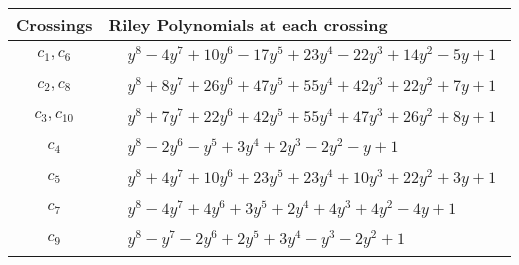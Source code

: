 \documentclass[1p]{elsarticle_modified}
\theoremstyle{definition}
\begin{document}
\begin{tabular}{m{50pt}|m{274pt}}
Crossings & \hspace{64pt}Riley Polynomials at each crossing \\
\hline $$\begin{aligned}c_{1},c_{6}\end{aligned}$$&$\begin{aligned}
&y^8-4 y^7+10 y^6-17 y^5+23 y^4-22 y^3+14 y^2-5 y+1
\end{aligned}$\\
\hline $$\begin{aligned}c_{2},c_{8}\end{aligned}$$&$\begin{aligned}
&y^8+8 y^7+26 y^6+47 y^5+55 y^4+42 y^3+22 y^2+7 y+1
\end{aligned}$\\
\hline $$\begin{aligned}c_{3},c_{10}\end{aligned}$$&$\begin{aligned}
&y^8+7 y^7+22 y^6+42 y^5+55 y^4+47 y^3+26 y^2+8 y+1
\end{aligned}$\\
\hline $$\begin{aligned}c_{4}\end{aligned}$$&$\begin{aligned}
&y^8-2 y^6- y^5+3 y^4+2 y^3-2 y^2- y+1
\end{aligned}$\\
\hline $$\begin{aligned}c_{5}\end{aligned}$$&$\begin{aligned}
&y^8+4 y^7+10 y^6+23 y^5+23 y^4+10 y^3+22 y^2+3 y+1
\end{aligned}$\\
\hline $$\begin{aligned}c_{7}\end{aligned}$$&$\begin{aligned}
&y^8-4 y^7+4 y^6+3 y^5+2 y^4+4 y^3+4 y^2-4 y+1
\end{aligned}$\\
\hline $$\begin{aligned}c_{9}\end{aligned}$$&$\begin{aligned}
&y^8- y^7-2 y^6+2 y^5+3 y^4- y^3-2 y^2+1
\end{aligned}$\\
\hline
\end{tabular}\\~\\
\end{document}
